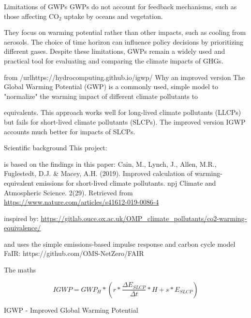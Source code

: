 \documentclass{tufte-handout}\usepackage[]{graphicx}\usepackage[]{xcolor}
\begin{document}
Limitations of GWPs
GWPs do not account for feedback mechanisms, such as those affecting CO$_2$ uptake by oceans and vegetation.


They focus on warming potential rather than other impacts, such as cooling from aerosols.
The choice of time horizon can influence policy decisions by prioritizing different gases.
Despite these limitations, GWPs remain a widely used and practical tool for evaluating and comparing the climate impacts of GHGs.

from /url{https://hydrocomputing.github.io/igwp/}
Why an improved version
The Global Warming Potential (GWP) is a commonly used, simple model to "normalize" the warming impact of different climate pollutants to 

  equivalents. This approach works well for long-lived climate pollutants (LLCPs) but fails for short-lived climate pollutants (SLCPs). The improved version IGWP accounts much better for impacts of SLCPs.

Scientific background
This project:

is based on the findings in this paper: Cain, M., Lynch, J., Allen, M.R., Fuglestedt, D.J. \& Macey, A.H. (2019). Improved calculation of warming- equivalent emissions for short-lived climate pollutants. npj Climate and Atmospheric Science. 2(29). Retrieved from \url{https://www.nature.com/articles/s41612-019-0086-4}

inspired by: \url{https://gitlab.ouce.ox.ac.uk/OMP_climate_pollutants/co2-warming-equivalence/}

and uses the simple emissions-based impulse response and carbon cycle model FaIR: https://github.com/OMS-NetZero/FAIR

The maths

\begin{equation}
IGWP = GWP_H * (r * \frac{\Delta E_{SLCP}}{\Delta t}*H + s * E_{SLCP})
\end{equation}


IGWP - Improved Global Warming Potential

	
\end{document}
